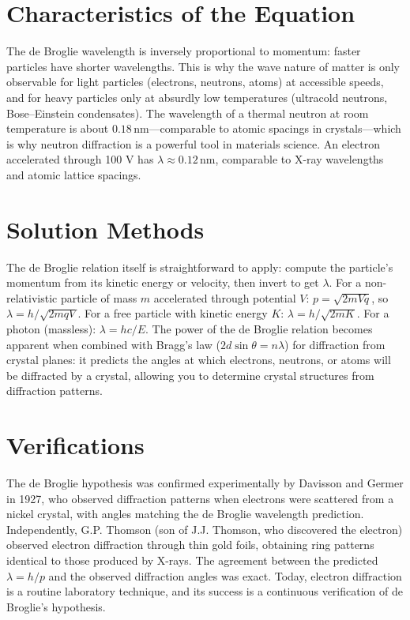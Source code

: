\documentclass[11pt,openright]{book}
\begin{document}
\section*{Characteristics of the Equation}

The de Broglie wavelength is inversely proportional to momentum: faster particles have shorter wavelengths. This is why the wave nature of matter is only observable for light particles (electrons, neutrons, atoms) at accessible speeds, and for heavy particles only at absurdly low temperatures (ultracold neutrons, Bose--Einstein condensates). The wavelength of a thermal neutron at room temperature is about $0.18\,\text{nm}$---comparable to atomic spacings in crystals---which is why neutron diffraction is a powerful tool in materials science. An electron accelerated through 100 V has $\lambda \approx 0.12\,\text{nm}$, comparable to X-ray wavelengths and atomic lattice spacings.
\section*{Solution Methods}

The de Broglie relation itself is straightforward to apply: compute the particle's momentum from its kinetic energy or velocity, then invert to get $\lambda$. For a non-relativistic particle of mass $m$ accelerated through potential $V$: $p = \sqrt{2mVq}$, so $\lambda = h/\sqrt{2mqV}$. For a free particle with kinetic energy $K$: $\lambda = h/\sqrt{2mK}$. For a photon (massless): $\lambda = hc/E$. The power of the de Broglie relation becomes apparent when combined with Bragg's law ($2d\sin\theta = n\lambda$) for diffraction from crystal planes: it predicts the angles at which electrons, neutrons, or atoms will be diffracted by a crystal, allowing you to determine crystal structures from diffraction patterns.
\section*{Verifications}

The de Broglie hypothesis was confirmed experimentally by Davisson and Germer in 1927, who observed diffraction patterns when electrons were scattered from a nickel crystal, with angles matching the de Broglie wavelength prediction. Independently, G.P. Thomson (son of J.J. Thomson, who discovered the electron) observed electron diffraction through thin gold foils, obtaining ring patterns identical to those produced by X-rays. The agreement between the predicted $\lambda = h/p$ and the observed diffraction angles was exact. Today, electron diffraction is a routine laboratory technique, and its success is a continuous verification of de Broglie's hypothesis.
\end{document}
